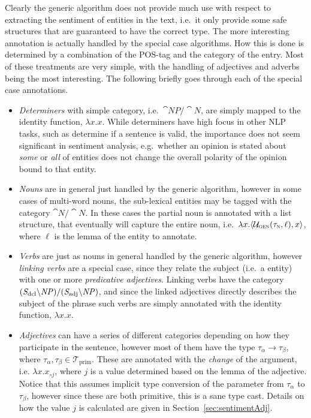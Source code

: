 Clearly the generic algorithm does not provide much use with respect to extracting the sentiment of entities in the text, i.e.\ it only provide some safe structures that are guaranteed to have the correct type. The more interesting annotation is actually handled by the special case algorithms. How this is done is determined by a combination of the POS-tag and the category of the entry. Most of these treatments are very simple, with the handling of adjectives and adverbs being the most interesting. The following briefly goes through each of the special case annotations.

\begin{itemize}
	\item \emph{Determiners} with simple category, i.e.\ $\cat{NP}/\cat{N}$, are simply mapped to the identity function, $\lambda x.x$.
	While determiners have high focus in other NLP tasks, such as determine if a sentence is valid, the importance does not seem significant in sentiment analysis, e.g.\ whether an opinion is stated about \emph{some} or \emph{all} of entities does not change the overall polarity of the opinion bound to that entity.

	\item \emph{Nouns} are in general just handled by the generic algorithm, however in some cases of multi-word nouns, the sub-lexical entities may be tagged with the category $\cat{N}/\cat{N}$. In these cases the partial noun is annotated with a list structure, that eventually will capture the entire noun, i.e.\ $\lambda x.\langle \mathcal{U}_\textsc{gen}(\tau_\textsc{n}, \ell), x\rangle$, where $\ell$ is the lemma of the entity to annotate.

	\item \emph{Verbs} are just as nouns in general handled by the generic algorithm, however \emph{linking verbs} are a special case, since they relate the subject (i.e.\ a entity) with one or more \emph{predicative adjectives}. Linking verbs have the category $({\mathit{S}}_\mathrm{dcl} \backslash {\mathit{NP}})/({\mathit{S}}_\mathrm{adj} \backslash {\mathit{NP}})$, and since the linked adjectives directly describes the subject of the phrase such verbs are simply annotated with the identity function, $\lambda x.x$. 

	\item \emph{Adjectives} can have a series of different categories depending on how they participate in the sentence, however most of them have the type $\tau_\alpha \to \tau_\beta$, where $\tau_\alpha, \tau_\beta \in \mathcal{T}_\mathrm{prim}$. These are annotated with the \emph{change} of the argument, i.e. $\lambda x.x_{\circ j}$, where $j$ is a value determined based on the lemma of the adjective. Notice that this assumes implicit type conversion of the parameter from $\tau_\alpha$ to $\tau_\beta$, however since these are both primitive, this is a sane type cast. Details on how the value $j$ is calculated are given in Section~\ref{sec:sentimentAdj}.


\end{itemize}
